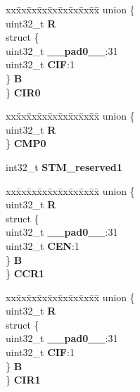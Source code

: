 \begin{DoxyCompactItemize}
\begin{tabbing}
\end{tabbing}\item 
\mbox{\label{structSTM__tag_a2fcff507810692975fee401d9a8afc49}} 
\begin{tabbing}
xx\=xx\=xx\=xx\=xx\=xx\=xx\=xx\=xx\=\kill
union \{\\
\>uint32\_t {\bfseries R}\\
\>struct \{\\
\>\>uint32\_t {\bfseries \_\_pad0\_\_}:31\\
\>\>uint32\_t {\bfseries CIF}:1\\
\>\} {\bfseries B}\\
\} {\bfseries CIR0}\\

\end{tabbing}\item 
\mbox{\label{structSTM__tag_ad7202fcdd4e21a869b5777d13f103efc}} 
\begin{tabbing}
xx\=xx\=xx\=xx\=xx\=xx\=xx\=xx\=xx\=\kill
union \{\\
\>uint32\_t {\bfseries R}\\
\} {\bfseries CMP0}\\

\end{tabbing}\item 
\mbox{\label{structSTM__tag_acc88f732d544b3b6eb0a45c114ac7809}} 
int32\+\_\+t {\bfseries S\+T\+M\+\_\+reserved1}
\item 
\mbox{\label{structSTM__tag_a151eb5c29ba59be05bc691f99eaf83a2}} 
\begin{tabbing}
xx\=xx\=xx\=xx\=xx\=xx\=xx\=xx\=xx\=\kill
union \{\\
\>uint32\_t {\bfseries R}\\
\>struct \{\\
\>\>uint32\_t {\bfseries \_\_pad0\_\_}:31\\
\>\>uint32\_t {\bfseries CEN}:1\\
\>\} {\bfseries B}\\
\} {\bfseries CCR1}\\

\end{tabbing}\item 
\mbox{\label{structSTM__tag_a427c2db3b38cecf93093ff04f33d55c0}} 
\begin{tabbing}
xx\=xx\=xx\=xx\=xx\=xx\=xx\=xx\=xx\=\kill
union \{\\
\>uint32\_t {\bfseries R}\\
\>struct \{\\
\>\>uint32\_t {\bfseries \_\_pad0\_\_}:31\\
\>\>uint32\_t {\bfseries CIF}:1\\
\>\} {\bfseries B}\\
\} {\bfseries CIR1}\\


\end{tabbing}
\end{DoxyCompactItemize}

